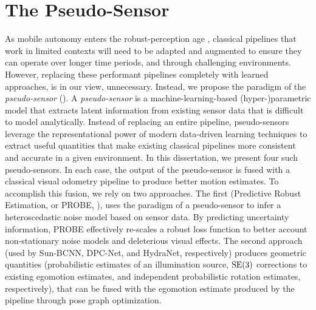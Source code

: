 \section{The Pseudo-Sensor}

As mobile autonomy enters the robust-perception age \citep{Cadena2016-ds}, classical pipelines that work in limited contexts will need to be adapted and augmented to ensure they can operate over longer time periods, and through challenging environments. However, replacing these performant pipelines completely with learned approaches, is in our view, unnecessary. Instead, we propose the paradigm of the  \textit{pseudo-sensor} (). A \textit{pseudo-sensor} is a machine-learning-based (hyper-)parametric model that extracts latent information from existing sensor data that is difficult to model analytically. Instead of replacing an entire pipeline, pseudo-sensors leverage the representational power of modern data-driven learning techniques to extract useful quantities that make existing classical pipelines more consistent and accurate in a given environment. In this dissertation, we present four such pseudo-sensors. In each case, the output of the pseudo-sensor is fused with a classical visual odometry pipeline to produce better motion estimates. To accomplish this fusion, we rely on two approaches. The first (Predictive Robust Estimation, or PROBE, ), uses the paradigm of a pseudo-sensor to infer a heteroscedastic noise model based on sensor data. By predicting uncertainty information, PROBE effectively re-scales a robust loss function to better account non-stationary noise models and deleterious visual effects. The second approach (used by Sun-BCNN, DPC-Net, and HydraNet,   respectively) produces geometric quantities (probabilistic estimates of an illumination source, $\mathrm{SE}(3)$ corrections to existing egomotion estimates, and independent probabilistic rotation estimates, respectively), that can be fused with the egomotion estimate produced by the pipeline through pose graph optimization.


